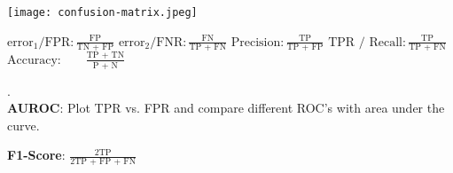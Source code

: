 \begin{multicols*}{2}
	\begin{center}
		\texttt{[image: confusion-matrix.jpeg]}
	\end{center}
	
	$\text{error}_1 / \text{FPR}: \frac{\text{FP}}{\text{TN + FP}}$
	$\text{error}_2 / \text{FNR}: \frac{\text{FN}}{\text{TP + FN}}$
	$\text{Precision}: \frac{\text{TP}}{\text{TP + FP}}$
	$\text{TPR / Recall}: \frac{\text{TP}}{\text{TP + FN}}$
	$\text{Accuracy}: \; \; \; \quad \frac{\text{TP + TN}}{\text{P + N}}$
\end{multicols*}

.\\[-20pt]
\textbf{AUROC}: Plot TPR vs. FPR and compare different ROC's with area under the curve.

\textbf{F1-Score}: \quad $\frac{2\text{TP}}{2\text{TP + FP + FN}}$
  